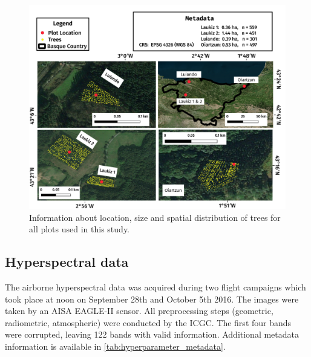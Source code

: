 \documentclass[journal]{IEEEtran}
\begin{document}
\begin{figure} [ht!]
	\begin{center}
		\centering
		\includegraphics[width=\textwidth] {study-area-hyperspectral.pdf}
		\caption{Information about location, size and spatial distribution of trees for all plots used in this study.}\label{fig:study_area}
	\end{center}
\end{figure}


\subsection{Hyperspectral data}

The airborne hyperspectral data was acquired during two flight campaigns which took place at noon on September 28th and October 5th 2016.
The images were taken by an AISA EAGLE-II sensor.
All preprocessing steps (geometric, radiometric, atmospheric) were conducted by the \ac{ICGC}.
The first four bands were corrupted, leaving 122 bands with valid information.
Additional metadata information is available in \autoref{tab:hyperparameter_metadata}.
\end{document}
